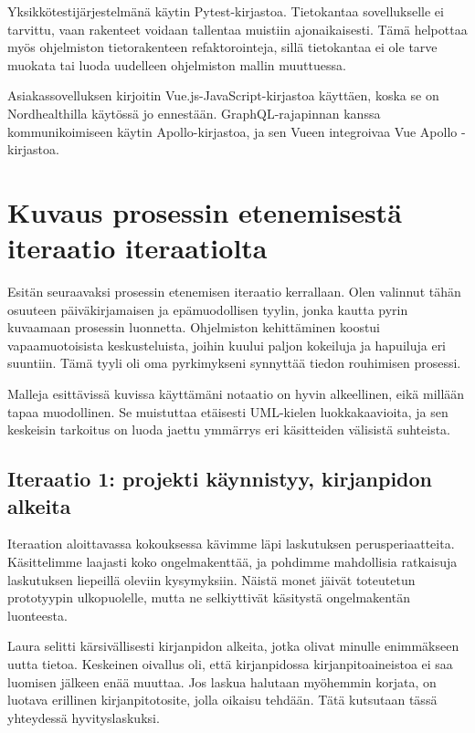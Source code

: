 Yksikkötestijärjestelmänä käytin Pytest-kirjastoa. Tietokantaa
sovellukselle ei tarvittu, vaan rakenteet voidaan tallentaa muistiin
ajonaikaisesti. Tämä helpottaa myös ohjelmiston tietorakenteen
refaktorointeja, sillä tietokantaa ei ole tarve muokata tai luoda
uudelleen ohjelmiston mallin muuttuessa.

Asiakassovelluksen kirjoitin Vue.js-JavaScript-kirjastoa käyttäen, koska
se on Nordhealthilla käytössä jo ennestään. GraphQL-rajapinnan kanssa
kommunikoimiseen käytin Apollo-kirjastoa, ja sen Vueen integroivaa Vue
Apollo -kirjastoa.

\hypertarget{kuvaus-prosessin-etenemisestuxe4-iteraatio-iteraatiolta}{%
\section{Kuvaus prosessin etenemisestä iteraatio
iteraatiolta}\label{kuvaus-prosessin-etenemisestuxe4-iteraatio-iteraatiolta}}

Esitän seuraavaksi prosessin etenemisen iteraatio kerrallaan. Olen
valinnut tähän osuuteen päiväkirjamaisen ja epämuodollisen tyylin, jonka
kautta pyrin kuvaamaan prosessin luonnetta. Ohjelmiston kehittäminen
koostui vapaamuotoisista keskusteluista, joihin kuului paljon kokeiluja
ja hapuiluja eri suuntiin. Tämä tyyli oli oma pyrkimykseni synnyttää
tiedon rouhimisen prosessi.

Malleja esittävissä kuvissa käyttämäni notaatio on hyvin alkeellinen,
eikä millään tapaa muodollinen. Se muistuttaa etäisesti UML-kielen
luokkakaavioita, ja sen keskeisin tarkoitus on luoda jaettu ymmärrys eri
käsitteiden välisistä suhteista.

\hypertarget{iteraatio-1-projekti-kuxe4ynnistyy-kirjanpidon-alkeita}{%
\subsection{Iteraatio 1: projekti käynnistyy, kirjanpidon
alkeita}\label{iteraatio-1-projekti-kuxe4ynnistyy-kirjanpidon-alkeita}}

Iteraation aloittavassa kokouksessa kävimme läpi laskutuksen
perusperiaatteita. Käsittelimme laajasti koko ongelmakenttää, ja
pohdimme mahdollisia ratkaisuja laskutuksen liepeillä oleviin
kysymyksiin. Näistä monet jäivät toteutetun prototyypin ulkopuolelle,
mutta ne selkiyttivät käsitystä ongelmakentän luonteesta.

Laura selitti kärsivällisesti kirjanpidon alkeita, jotka olivat minulle
enimmäkseen uutta tietoa. Keskeinen oivallus oli, että kirjanpidossa
kirjanpitoaineistoa ei saa luomisen jälkeen enää muuttaa. Jos laskua
halutaan myöhemmin korjata, on luotava erillinen kirjanpitotosite, jolla
oikaisu tehdään. Tätä kutsutaan tässä yhteydessä hyvityslaskuksi.

